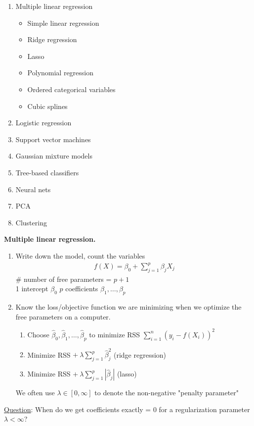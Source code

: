 \documentclass[12pt, letterpaper]{article}
\begin{document}
\begin{enumerate}
    \item Multiple linear regression 
    \begin{itemize}
        \item Simple linear regression
        \item Ridge regression
        \item Lasso
        \item Polynomial regression
        \item Ordered categorical variables
        \item Cubic splines
    \end{itemize}
    \item Logistic regression
    \item Support vector machines
    \item Gaussian mixture models
    \item Tree-based classifiers
    \item Neural nets
    \item PCA
    \item Clustering
\end{enumerate}
\textbf{Multiple linear regression.}
\begin{enumerate}
    \item Write down the model, count the variables 
    \begin{align*}
        f(X) = \beta_0 + \sum_{j=1}^{p} \beta_j X_j
    \end{align*}
    \# number of free parameters = $p+1$ \\
    1 intercept $\beta_0$
    $p$ coefficients $\beta_1, \dots, \beta_p$
    \item Know the loss/objective function we are minimizing when we optimize the 
    free parameters on a computer.
    \begin{enumerate}
        \item Choose $\hat \beta_0, \hat \beta_1, \dots, \hat \beta_p$ to minimize
        RSS $\sum_{i=1}^{n}(y_i - f(X_i))^2$
        \item Minimize RSS $+\ \lambda \sum_{j=1}^{p} \hat \beta_j^2$ (ridge regression)
        \item Minimize RSS $+\ \lambda \sum_{j=1}^{p} |\hat \beta_j|$ (lasso)
    \end{enumerate}
    We often use $\lambda \in [0,\infty]$ to denote the non-negative "penalty parameter"
\end{enumerate}
\underline{Question}: When do we get coefficients exactly = 0 for a regularization parameter $\lambda < \infty$?
\end{document}
